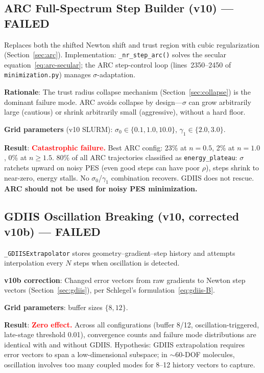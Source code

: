\documentclass[11pt,a4paper]{article}
\theoremstyle{definition}
\begin{document}
\subsection{ARC Full-Spectrum Step Builder (v10) --- FAILED}

Replaces both the shifted Newton shift and trust region with cubic
regularization (Section~\ref{sec:arc}).  Implementation:
\texttt{\_nr\_step\_arc()} solves the secular
equation~\eqref{eq:arc-secular}; the ARC step-control loop
(lines~2350--2450 of \texttt{minimization.py}) manages $\sigma$-adaptation.

\textbf{Rationale}: The trust radius collapse mechanism
(Section~\ref{sec:collapse}) is the dominant failure mode.  ARC avoids
collapse by design---$\sigma$ can grow arbitrarily large (cautious) or
shrink arbitrarily small (aggressive), without a hard floor.

\textbf{Grid parameters} (v10 SLURM):
$\sigma_0 \in \{0.1, 1.0, 10.0\}$,
$\gamma_1 \in \{2.0, 3.0\}$.

\textbf{Result}: \textcolor{red}{\textbf{Catastrophic failure.}}  Best ARC
config: 23\% at $n=0.5$, 2\% at $n=1.0$, 0\% at $n\geq 1.5$.
80\% of all ARC trajectories classified as \texttt{energy\_plateau}:
$\sigma$ ratchets upward on noisy PES (even good steps can have poor
$\rho$), steps shrink to near-zero, energy stalls.
No $\sigma_0$/$\gamma_1$ combination recovers.  GDIIS does not rescue.
\textbf{ARC should not be used for noisy PES minimization.}

\subsection{GDIIS Oscillation Breaking (v10, corrected v10b) --- FAILED}

\texttt{\_GDIISExtrapolator} stores geometry--gradient--step history and
attempts interpolation every $N$ steps when oscillation is detected.

\textbf{v10b correction}: Changed error vectors from raw gradients to Newton
step vectors (Section~\ref{sec:gdiis}), per Schlegel's
formulation~\eqref{eq:gdiis-B}.

\textbf{Grid parameters}: buffer sizes $\{8, 12\}$.

\textbf{Result}: \textcolor{red}{\textbf{Zero effect.}}  Across all
configurations (buffer 8/12, oscillation-triggered, late-stage threshold
0.01), convergence counts and failure mode distributions are identical
with and without GDIIS.  Hypothesis: GDIIS extrapolation requires
error vectors to span a low-dimensional subspace; in $\sim$60-DOF
molecules, oscillation involves too many coupled modes for 8--12
history vectors to capture.
\end{document}
